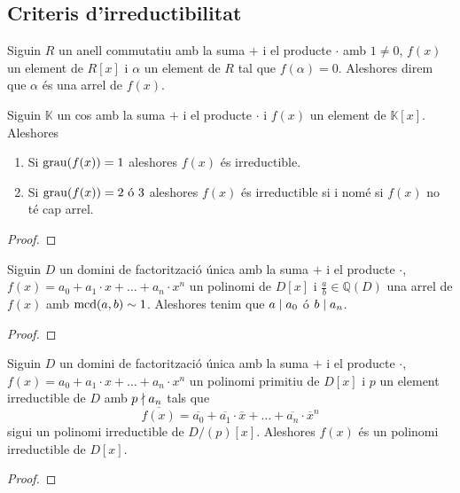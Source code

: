 \documentclass[../Apunts.tex]{subfiles}
\begin{document}
	\subsection{Criteris d'irreductibilitat}
	\begin{definition}[Arrel]
		\label{def:arrel d'un polinomi}
		Siguin \(R\) un anell commutatiu amb la suma \(+\) i el producte \(\cdot\) amb \(1\neq0\), \(f(x)\) un element de \(R[x]\) i \(\alpha\) un element de \(R\) tal que \(f(\alpha)=0\). Aleshores direm que \(\alpha\) és una arrel de \(f(x)\).
	\end{definition}
	\begin{proposition}
		Siguin \(\mathbb{K}\) un cos amb la suma \(+\) i el producte \(\cdot\) i \(f(x)\) un element de \(\mathbb{K}[x]\). Aleshores
		\begin{enumerate}
			\item Si \(\operatorname{grau}(f(x))=1\) aleshores \(f(x)\) és irreductible.
			\item Si \(\operatorname{grau}(f(x))=2\text{ ó }3\) aleshores \(f(x)\) és irreductible si i nomé si \(f(x)\) no té cap arrel.
		\end{enumerate}
		\begin{proof}
		\end{proof}
	\end{proposition}
	\begin{proposition}
		Siguin \(D\) un domini de factorització única amb la suma \(+\) i el producte \(\cdot\), \(f(x)=a_{0}+a_{1}\cdot x+\dots+a_{n}\cdot x^{n}\) un polinomi de \(D[x]\) i \(\frac{a}{b}\in\mathbb{Q}(D)\) una arrel de \(f(x)\) amb \(\operatorname{mcd}(a,b)\sim1\). Aleshores tenim que \(a\mathrel{|} a_{0}\) ó \(b\mathrel{|} a_{n}\).
		\begin{proof}
		\end{proof}
	\end{proposition}
	\begin{theorem}
		\label{thm:Criteri modular}
		Siguin \(D\) un domini de factorització única amb la suma \(+\) i el producte \(\cdot\), \(f(x)=a_{0}+a_{1}\cdot x+\dots+a_{n}\cdot x^{n}\) un polinomi primitiu de \(D[x]\) i \(p\) un element irreductible de \(D\) amb \(p\mathrel{\nmid} a_{n}\) tals que
		\[\overline{f(x)}=\overline{a_{0}}+\overline{a_{1}}\cdot\overline{x}+\dots+\overline{a_{n}}\cdot\overline{x}^{n}\]
		sigui un polinomi irreductible de \(D/(p)[x]\). Aleshores \(f(x)\) és un polinomi irreductible de \(D[x]\).
		\begin{proof}
		\end{proof}
	\end{theorem}
\end{document}

